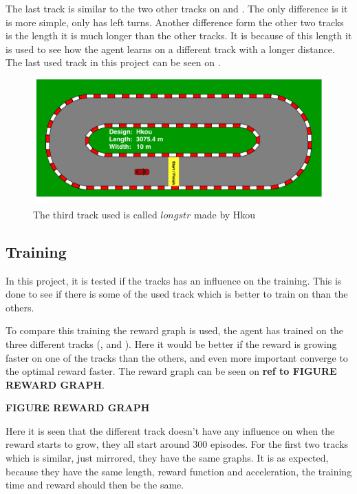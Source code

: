 The last track is similar to the two other tracks on  and . The only difference is it is more simple, only has left turns. Another difference form the other two tracks is the length it is much longer than the other tracks. It is because of this length it is used to see how the agent learns on a different track with a longer distance. The last used track in this project can be seen on . 

\begin{figure}[H]
	\centering
	\includegraphics[width=1\textwidth]{Figures/Result/track_longstr.pdf}
	\caption{The third track used is called $longstr$ made by Hkou}
	\label{fig:track_longstr}
\end{figure}


\subsection*{Training}
In this project, it is tested if the tracks has an influence on the training. This is done to see if there is some of the used track which is better to train on than the others.

To compare this training the reward graph is used, the agent has trained on the three different tracks (,  and ). Here it would be better if the reward is growing faster on one of the tracks than the others, and even more important converge to the optimal reward faster. The reward graph can be seen on \textbf{ref to FIGURE REWARD GRAPH}.

\textbf{FIGURE REWARD GRAPH}

Here it is seen that the different track doesn't have any influence on when the reward starts to grow, they all start around 300 episodes. For the first two tracks which is similar, just mirrored, they have the same graphs. It is as expected, because they have the same length, reward function and acceleration, the training time and reward should then be the same. 

